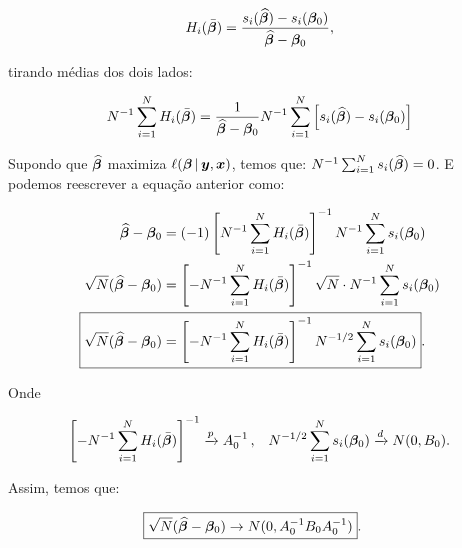\documentclass[11pt,oneside,a4paper]{article}
\numberwithin{equation}{section}
\begin{document}
\begin{description}
\begin{description}
\vspace{-1 em}
\begin{align*}
H_{i} ( \bar{\boldsymbol{\beta}} ) =
\frac{s_{i}( \widehat{\boldsymbol{\beta}} ) - s_{i}( \boldsymbol{\beta}_{0} )}{\widehat{\boldsymbol{\beta}} - \boldsymbol{\beta}_{0}},
\end{align*}

\noindent
tirando médias dos dois lados:

\vspace{-1 em}
\begin{align*}
N^{-1} \sum_{i=1}^{N} 
H_{i} ( \bar{\boldsymbol{\beta}} ) 
=
\frac{1}{\widehat{\boldsymbol{\beta}} - \boldsymbol{\beta}_{0}}
N^{-1} \sum_{i=1}^{N} 
\left[ 
s_{i}( \widehat{\boldsymbol{\beta}} ) - s_{i}( \boldsymbol{\beta}_{0} )
\right]
\end{align*}

Supondo que
$\widehat{\boldsymbol{\beta}}$
maximiza
$\ell (\boldsymbol{\beta} \, | \, \boldsymbol{y}, \boldsymbol{x})$,
temos que:
$N^{-1} \sum_{i=1}^{N} s_{i}(\widehat{\boldsymbol{\beta}}) = 0$.
E podemos reescrever a equação anterior como:

\vspace{-1 em}
\begin{align*}
\widehat{\mbs{\beta}} - \mbs{\beta}_{0}
&=
(-1)
\left[ N^{-1} \sum_{i=1}^{N} H_{i} ( \bar{\mbs{\beta}} ) \right]^{-1}
N^{-1} \sum_{i=1}^{N} s_{i}( \mbs{\beta}_{0} ) 
\\
\sqrt{N} ( \widehat{\mbs{\beta}} - \mbs{\beta}_{0} )
&=
\left[
- N^{-1} \sum_{i=1}^{N} H_{i} ( \bar{\mbs{\beta}} )
\right]^{-1}
\sqrt{N} \cdot N^{-1} \sum_{i=1}^{N} s_{i}( \mbs{\beta}_{0} ) 
\\
\Aboxed{
\sqrt{N} ( \widehat{\mbs{\beta}} - \mbs{\beta}_{0} )
&=
\left[
- N^{-1} \sum_{i=1}^{N} H_{i} ( \bar{\mbs{\beta}} )
\right]^{-1}
N^{-1/2} \sum_{i=1}^{N} s_{i}( \mbs{\beta}_{0} ) }.
\end{align*}

\noindent
Onde

\vspace{-1 em}
\begin{align*}
\left[ 
- N^{-1} \sum_{i=1}^{N}
H_{i} ( \bar{\boldsymbol{\beta}} ) \right]^{-1}
\xrightarrow{p}
A_{0}^{-1} \, ,
&&
N^{-1/2} \sum_{i=1}^{N} s_{i}( \boldsymbol{\beta}_{0} ) 
\xrightarrow{d}
N( 0, B_{0} ).
\end{align*}

\noindent
Assim, temos que:

\vspace{-1 em}
\begin{align*}
\Aboxed{
\sqrt{N} ( \widehat{\mbs{\beta}} - \mbs{\beta}_{0} )
\to
N ( 0, A_{0}^{-1} B_{0} A_{0}^{-1} )}.
\end{align*}


\end{description}
\end{description}
\end{document}
